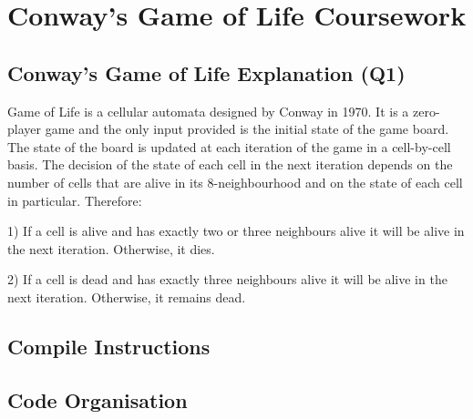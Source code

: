 \documentclass[a4paper,12pt,twoside]{report}
\author{Luis Carlos Garcia-Peraza Herrera}
\date{\today}
\begin{document}
\chapter*{Conway's Game of Life Coursework}
\section*{Conway's Game of Life Explanation (Q1)}
	
Game of Life is a cellular automata designed by Conway in 1970. It is a zero-player game and the only input provided is the initial state of the game board.
The state of the board is updated at each iteration of the game in a cell-by-cell basis. The decision of the state of each cell in the next iteration depends
on the number of cells that are alive in its 8-neighbourhood and on the state of each cell in particular. Therefore:

1) If a cell is alive and has exactly two or three neighbours alive it will be alive in the next iteration. Otherwise, it dies.

2) If a cell is dead and has exactly three neighbours alive it will be alive in the next iteration. Otherwise, it remains dead.

\section*{Compile Instructions}

\section*{Code Organisation}
	
\end{document}
